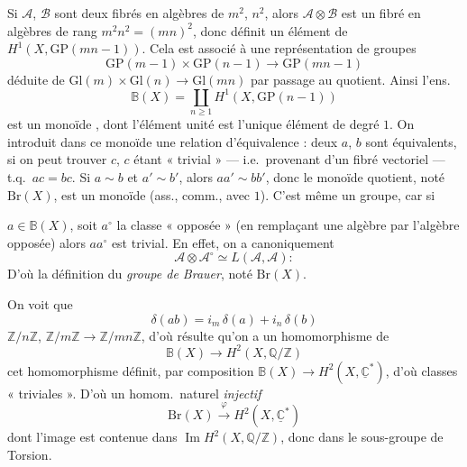 \documentclass[11pt,a4paper]{article}
\begin{document}
Si $\mathcal{A}$, $\mathcal{B}$ sont deux fibrés en algèbres de
\struck{\ill{}}  $m^2$, $n^2$, alors $\mathcal{A} \otimes
\mathcal{B}$ est un fibré en algèbres de rang $m^2 n^2 = (mn)^2$, donc définit
un élément de $H^1(X, \mathrm{GP}(mn-1))$. Cela est associé à une
représentation de groupes
\[
  \mathrm{GP}(m-1) \times \mathrm{GP}(n-1) \longrightarrow \mathrm{GP}(mn-1)
\]
déduite de $\mathrm{Gl}(m) \times \mathrm{Gl}(n) \longrightarrow
\mathrm{Gl}(mn)$ par passage au quotient. Ainsi l'ens.
\[
  \mathbb{B}(X) = \coprod_{n \geqslant 1} H^1(X, \mathrm{GP}(n-1))
\]
est un \struck{\ill{}} monoïde , dont
l'élément unité est l'unique élément de degré $1$. On \struck{\ill{}}
introduit dans ce monoïde une relation d'équivalence : deux \struck{\ill{}} 
$a$, $b$ sont équivalents, si on peut trouver $c$, $c$ étant « trivial » ---
i.e.\ provenant d'un fibré vectoriel --- t.q.\ $ac = bc$. Si $a \sim b$ et
$a' \sim b'$, alors $aa' \sim bb'$, donc le monoïde quotient, noté
$\mathrm{Br}(X)$, est un monoïde \struck{\ill{}} (ass., comm., avec $1$).
C'est même un groupe, car si


$a \in \mathbb{B}(X)$, soit $a^{\circ}$ la classe « opposée » (en remplaçant
une algèbre par l'algèbre opposée) alors $aa^{\circ}$ est trivial. En effet,
on a canoniquement
\[
  \mathcal{A} \otimes \mathcal{A}^{\circ} \simeq L(\mathcal{A}, \mathcal{A}) :
\]
D'où la définition du \emph{groupe de Brauer}, noté $\mathrm{Br}(X)$.

On voit que
\[
  \delta(ab) = i_m\,\delta(a) + i_n\,\delta(b)
\]
\ill{} \ill{} \ill{} $\mathbb{Z}/n\mathbb{Z}$, $\mathbb{Z}/m\mathbb{Z}
\to \mathbb{Z}/mn\mathbb{Z}$, d'où résulte qu'on a un homomorphisme de
 
\[
  \mathbb{B}(X) \longrightarrow H^2(X, \mathbb{Q}/\mathbb{Z})
\]
cet homomorphisme définit, par composition
$\mathbb{B}(X) \to H^2(X, \underline{\mathbb{C}}^{*})$, d'où \ill{}
\struck{\ill{} \ill{}}  \struck{\ill{} \ill{} \ill{}}
 classes « triviales ». \struck{\ill{}} D'où un homom.\
naturel \emph{injectif}
\[
  \boxed{\mathrm{Br}(X) \xrightarrow{\ \varphi\ } H^2(X, \underline{\mathbb{C}}^{*})}
\]
dont l'image est contenue dans $\operatorname{Im} H^2(X,
\mathbb{Q}/\mathbb{Z})$, donc dans le sous-groupe de Torsion.
\end{document}
